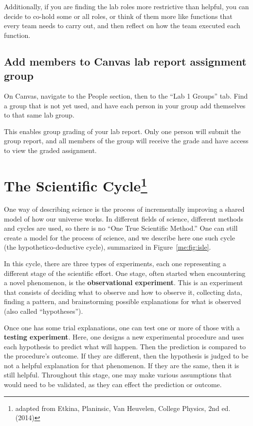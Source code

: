 Additionally, if you are finding the lab roles more restrictive than helpful, you can decide to co-hold some or all roles, or think of them more like functions that every team needs to carry out, and then reflect on how the team executed each function.

\subsection{Add members to Canvas lab report assignment group}

\begin{steps}
	\item On Canvas, navigate to the People section, then to the ``Lab 1 Groups'' tab. Find a group that is not yet used, and have each person in your group add themselves to that same lab group.
\end{steps}

This enables group grading of your lab report. Only one person will submit the group report, and all members of the group will receive the grade and have access to view the graded assignment.

\section{The Scientific Cycle\protect\footnote{adapted from Etkina, Planinsic, Van Heuvelen, College Physics, 2nd ed. (2014)}}

One way of describing science is the process of incrementally improving a shared model of how our universe works. In different fields of science, different methods and cycles are used, so there is no ``One True Scientific Method.'' One can still create a model for the process of science, and we describe here one such cycle (the hypothetico-deductive cycle), summarized in Figure~\ref{me:fig:isle}.

In this cycle, there are three types of experiments, each one representing a different stage of the scientific effort. One stage, often started when encountering a novel phenomenon, is the \textbf{observational experiment}. This is an experiment that consists of deciding what to observe and how to observe it, collecting data, finding a pattern, and brainstorming possible explanations for what is observed (also called ``hypotheses'').

Once one has some trial explanations, one can test one or more of those with a \textbf{testing experiment}. Here, one designs a new experimental procedure and uses each hypothesis to predict what will happen. Then the prediction is compared to the procedure's outcome. If they are different, then the hypothesis is judged to be not a helpful explanation for that phenomenon. If they are the same, then it is still helpful. Throughout this stage, one may make various assumptions that would need to be validated, as they can effect the prediction or outcome.

